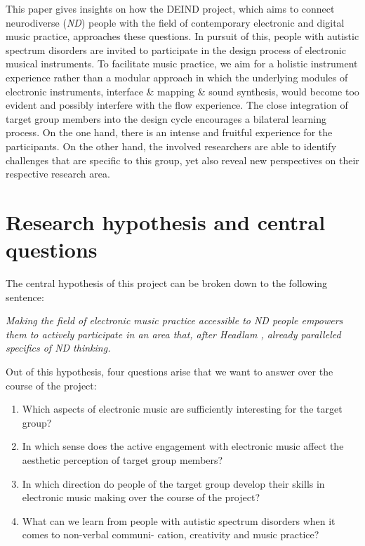 \documentclass{chi-ext}
\begin{document}
\begin{multicols}{2}
This paper gives insights on how the DEIND project, which aims to connect neurodiverse (\emph{ND}) people with the field of contemporary electronic and digital music practice, approaches these questions.
In pursuit of this, people with autistic spectrum disorders are invited to participate in the design process of electronic musical instruments. 
To facilitate music practice, we aim for a holistic instrument experience rather than a modular approach in which the underlying modules of electronic instruments, interface \& mapping \& sound synthesis, would become too evident and possibly interfere with the flow experience. 
The close integration of target group members into the design cycle encourages a bilateral learning process. 
On the one hand, there is an intense and fruitful experience for the participants. On the other hand, the involved researchers are able to identify challenges that are specific to this group, yet also reveal new perspectives on their respective research area.

\section{Research hypothesis and central questions}
\label{sec:research_objectives}


The central hypothesis of this project can be broken down to the following sentence: 

\emph{Making the field of electronic music practice accessible to ND people empowers them to actively participate in an area that, after Headlam \cite{headlam2006-lea}, already paralleled specifics of ND thinking.}

Out of this hypothesis, four questions arise that we want to answer over the course of the project:

\begin{enumerate}
	\item Which aspects of electronic music are sufficiently interesting for the target group?
	\item In which sense does the active engagement with electronic music affect the aesthetic perception of target group members?
	\item In which direction do people of the target group develop their skills in electronic music making over the course of the project?
	\item What can we learn from people with autistic spectrum disorders when it comes to non-verbal communi- cation, creativity and music practice?
\end{enumerate}


\end{multicols}
\end{document}
